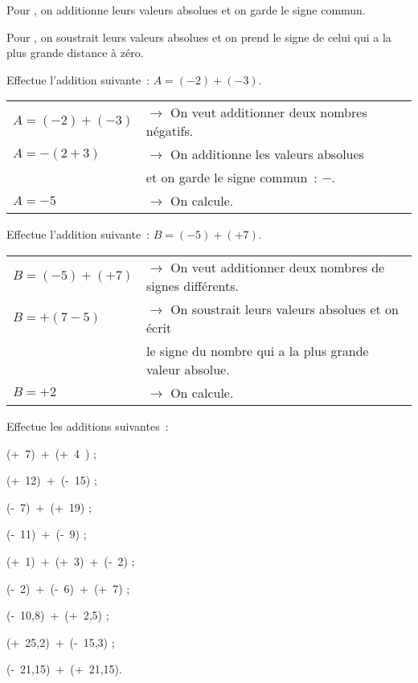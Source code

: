 

\begin{methode*1}

\begin{aconnaitre}
Pour , on additionne leurs valeurs absolues et on garde le signe commun.

Pour , on soustrait leurs valeurs absolues et on prend le signe de celui qui a la plus grande distance à zéro.
\end{aconnaitre}

\begin{exemple*1}
Effectue l'addition suivante : $A = (- 2) + (- 3)$.
\begin{tabular}{ll} 
$A = (- 2) + (- 3)$ & $\rightarrow$ On veut additionner deux nombres négatifs. \\
$A = - (2 + 3)$ & $\rightarrow$ On additionne les valeurs absolues \\
 & \phantom{$\rightarrow$} et on garde le signe commun : $-$. \\
$A = - 5$ & $\rightarrow$ On calcule. \\
\end{tabular}
 \end{exemple*1}
 
 \begin{exemple*1}
Effectue l'addition suivante : $B = (- 5) + (+ 7)$.
\begin{tabular}{ll} 
$B = (- 5) + (+ 7)$ & $\rightarrow$ On veut additionner deux nombres de signes différents. \\
$B = + (7 - 5)$ & $\rightarrow$ On soustrait leurs valeurs absolues et on écrit \\
 & \phantom{$\rightarrow$} le signe du nombre qui a la plus grande valeur absolue. \\
$B = + 2$ & $\rightarrow$ On calcule. \\
\end{tabular}
 \end{exemple*1}
 
 \exercice  
Effectue les additions suivantes :
\begin{colenumerate}{3}
 \item (+ 7) + (+ 4 ) ;
 \item (+ 12) + (- 15) ;
 \item (- 7) + (+ 19) ;
 \item (- 11) + (- 9) ;
 \item (+ 1) + (+ 3) + (- 2) ;
 \item (- 2) + (- 6) + (+ 7) ;
 \item (- 10,8) + (+ 2,5) ;
 \item (+ 25,2) + (- 15,3) ;
 \item (- 21,15) + (+ 21,15).
 \end{colenumerate}


\end{methode*1}
